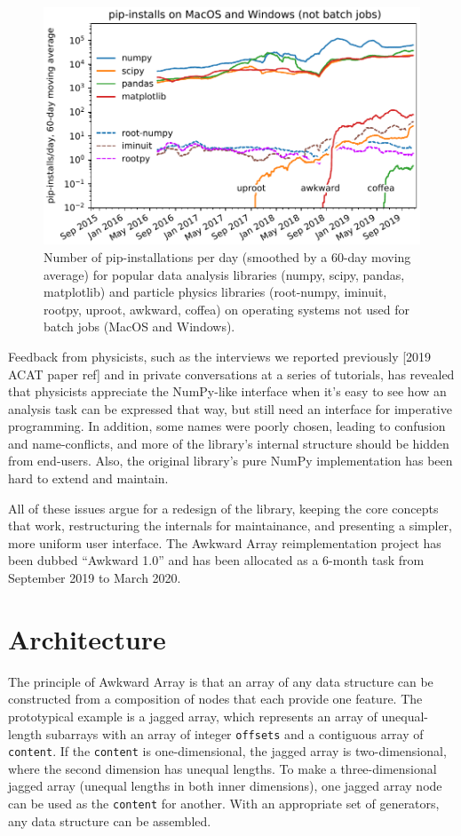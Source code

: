 \documentclass{webofc}
\begin{document}
\begin{figure}
\begin{center}
\includegraphics[width=0.75\linewidth]{pip-timeline.pdf}
\end{center}
\caption{Number of pip-installations per day (smoothed by a 60-day moving average) for popular data analysis libraries (numpy, scipy, pandas, matplotlib) and particle physics libraries (root-numpy, iminuit, rootpy, uproot, awkward, coffea) on operating systems not used for batch jobs (MacOS and Windows). \label{fig:pip-timeline}}
\end{figure}

Feedback from physicists, such as the interviews we reported previously [2019 ACAT paper ref] and in private conversations at a series of tutorials, has revealed that physicists appreciate the NumPy-like interface when it's easy to see how an analysis task can be expressed that way, but still need an interface for imperative programming. In addition, some names were poorly chosen, leading to confusion and name-conflicts, and more of the library's internal structure should be hidden from end-users. Also, the original library's pure NumPy implementation has been hard to extend and maintain.

All of these issues argue for a redesign of the library, keeping the core concepts that work, restructuring the internals for maintainance, and presenting a simpler, more uniform user interface. The Awkward Array reimplementation project has been dubbed ``Awkward 1.0'' and has been allocated as a 6-month task from September 2019 to March 2020.

\section{Architecture}

The principle of Awkward Array is that an array of any data structure can be constructed from a composition of nodes that each provide one feature. The prototypical example is a jagged array, which represents an array of unequal-length subarrays with an array of integer \texttt{offsets} and a contiguous array of \texttt{content}. If the \texttt{content} is one-dimensional, the jagged array is two-dimensional, where the second dimension has unequal lengths. To make a three-dimensional jagged array (unequal lengths in both inner dimensions), one jagged array node can be used as the \texttt{content} for another. With an appropriate set of generators, any data structure can be assembled.
\end{document}

